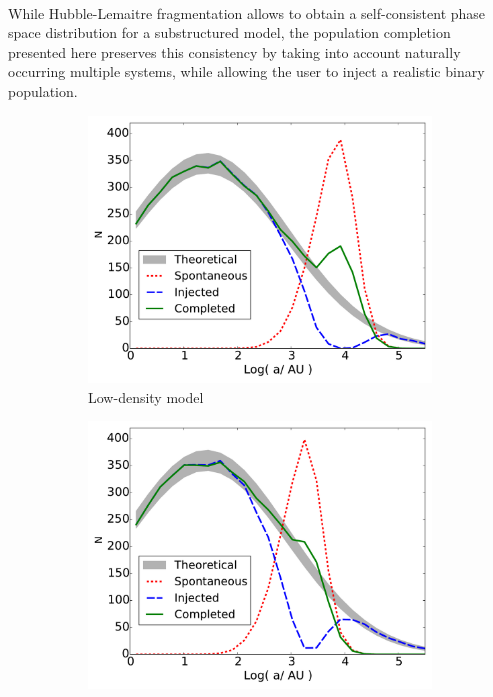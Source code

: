 \paragraph*{}
While Hubble-Lemaitre fragmentation allows to obtain a self-consistent phase space distribution for a substructured model, the population completion presented here preserves this consistency by taking into account naturally occurring multiple systems, while allowing the user to inject a realistic binary population.



\begin{figure}
    \centering
    \begin{subfigure}[b]{0.49\textwidth}
    	\centering
    	\includegraphics[width=\textwidth]{Figures/5_completed_smaxis_LD}
        \caption{Low-density model}
        \label{Fig:5_completed_smaxis_LD}
    \end{subfigure}
    \begin{subfigure}[b]{0.49\textwidth}
    	\centering
    	\includegraphics[width=\textwidth]{Figures/5_completed_smaxis_HD}

\end{subfigure}
\end{figure}
